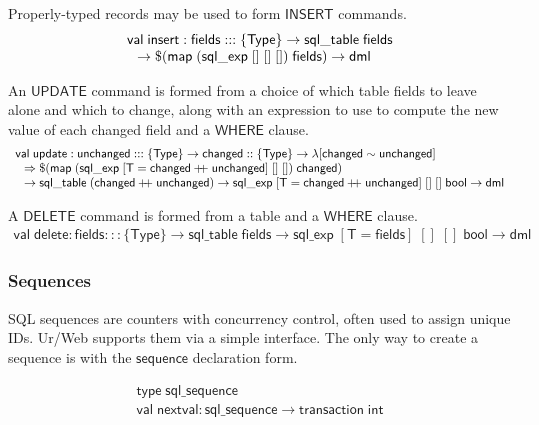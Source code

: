 \documentclass{article}
\newcommand{\mt}[1]{\mathsf{#1}}
\newcommand{\rc}{+ \hspace{-.075in} + \;}
\begin{document}
Properly-typed records may be used to form $\mt{INSERT}$ commands.
$$\begin{array}{l}
  \mt{val} \; \mt{insert} : \mt{fields} ::: \{\mt{Type}\} \to \mt{sql\_table} \; \mt{fields} \\
  \hspace{.1in} \to \$(\mt{map} \; (\mt{sql\_exp} \; [] \; [] \; []) \; \mt{fields}) \to \mt{dml}
\end{array}$$

An $\mt{UPDATE}$ command is formed from a choice of which table fields to leave alone and which to change, along with an expression to use to compute the new value of each changed field and a $\mt{WHERE}$ clause.
$$\begin{array}{l}
  \mt{val} \; \mt{update} : \mt{unchanged} ::: \{\mt{Type}\} \to \mt{changed} :: \{\mt{Type}\} \to \lambda [\mt{changed} \sim \mt{unchanged}] \\
  \hspace{.1in} \Rightarrow \$(\mt{map} \; (\mt{sql\_exp} \; [\mt{T} = \mt{changed} \rc \mt{unchanged}] \; [] \; []) \; \mt{changed}) \\
  \hspace{.1in} \to \mt{sql\_table} \; (\mt{changed} \rc \mt{unchanged}) \to \mt{sql\_exp} \; [\mt{T} = \mt{changed} \rc \mt{unchanged}] \; [] \; [] \; \mt{bool} \to \mt{dml}
\end{array}$$

A $\mt{DELETE}$ command is formed from a table and a $\mt{WHERE}$ clause.
$$\begin{array}{l}
  \mt{val} \; \mt{delete} : \mt{fields} ::: \{\mt{Type}\} \to \mt{sql\_table} \; \mt{fields} \to \mt{sql\_exp} \; [\mt{T} = \mt{fields}] \; [] \; [] \; \mt{bool} \to \mt{dml}
\end{array}$$

\subsubsection{Sequences}

SQL sequences are counters with concurrency control, often used to assign unique IDs.  Ur/Web supports them via a simple interface.  The only way to create a sequence is with the $\mt{sequence}$ declaration form.

$$\begin{array}{l}
  \mt{type} \; \mt{sql\_sequence} \\
  \mt{val} \; \mt{nextval} : \mt{sql\_sequence} \to \mt{transaction} \; \mt{int}
\end{array}$$
\end{document}
